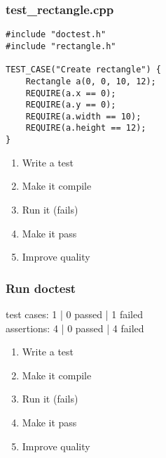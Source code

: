 \begin{frame}[fragile]
\frametitle{test\_rectangle.cpp}
\begin{minipage}[t]{0.48\linewidth}
\begin{lstlisting}
#include "doctest.h"
#include "rectangle.h"

TEST_CASE("Create rectangle") {
    Rectangle a(0, 0, 10, 12);
    REQUIRE(a.x == 0);
    REQUIRE(a.y == 0);
    REQUIRE(a.width == 10);
    REQUIRE(a.height == 12);
}
\end{lstlisting}
\end{minipage}\hfill
\begin{minipage}[t]{0.28\linewidth}
  \small
  \begin{enumerate} 
    \item \textcolor{deadcolor}{Write a test}
    \item \textcolor{activecolor}{Make it compile}
    \item \textcolor{deadcolor}{Run it (fails)}
    \item \textcolor{deadcolor}{Make it pass}
    \item \textcolor{deadcolor}{Improve quality}
  \end{enumerate} 
\end{minipage}
\end{frame}


\begin{frame}[fragile]
\frametitle{Run doctest}
\begin{minipage}[t]{0.48\linewidth}
test cases: 1 | 0 passed | 1 failed\\
assertions: 4 | 0 passed | 4 failed\\
\end{minipage}\hfill
\begin{minipage}[t]{0.28\linewidth}
  \small
  \begin{enumerate} 
    \item \textcolor{deadcolor}{Write a test}
    \item \textcolor{deadcolor}{Make it compile}
    \item \textcolor{activecolor}{Run it (fails)}
    \item \textcolor{deadcolor}{Make it pass}
    \item \textcolor{deadcolor}{Improve quality}
  \end{enumerate} 
\end{minipage}
\end{frame}



